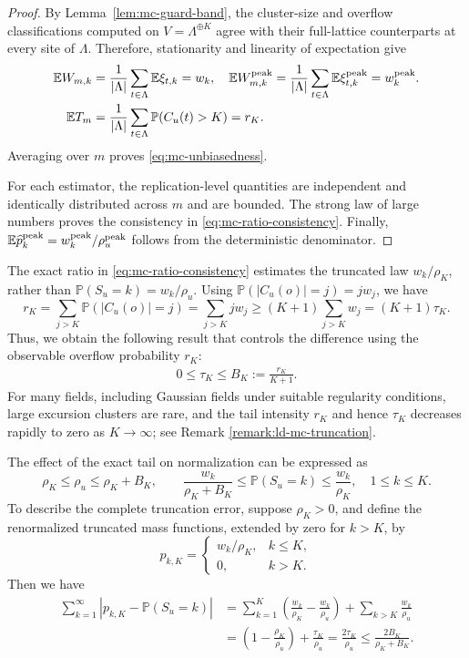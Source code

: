 \documentclass[aap,preprint]{imsart}
\theoremstyle{plain}
\theoremstyle{definition}
\def\E{{\mathbb E}}
\def\P{{\mathbb P}}
\begin{document}
\begin{proof}
	By Lemma~\ref{lem:mc-guard-band}, the cluster-size and overflow
	classifications computed on $V=\Lambda^{\oplus K}$ agree with their
	full-lattice counterparts at every site of $\Lambda$.  Therefore,
	stationarity and linearity of expectation give
	\begin{align*}
		\E W_{m,k}
		&=\frac1{|\Lambda|}\sum_{t\in\Lambda}\E\xi_{t,k}
		=w_k, \quad \E W_{m,k}^{\rm peak}
		=\frac1{|\Lambda|}\sum_{t\in\Lambda}
		\E\xi_{t,k}^{\rm peak}
		=w_k^{\rm peak}.\\
		\E T_m
		&=\frac1{|\Lambda|}\sum_{t\in\Lambda}
		\P(C_u(t)>K) = 
		r_K.
	\end{align*}
	Averaging over $m$ proves \eqref{eq:mc-unbiasedness}.  
	
	For each estimator, the replication-level quantities are independent and
	identically distributed across $m$ and are bounded.  The strong law of
	large numbers proves the consistency in \eqref{eq:mc-ratio-consistency}. Finally, $\E\widehat p_k^{\rm peak}=w_k^{\rm peak}/\rho_u^{\rm peak}$ follows
	from the deterministic denominator.
\end{proof}

The exact ratio in \eqref{eq:mc-ratio-consistency} estimates the truncated
law $w_k/\rho_K$, rather than $\P(S_u=k)=w_k/\rho_u$. 	Using $\P(|C_u(o)|=j)=j w_j$, we have
\[
r_K
=\sum_{j>K}\P(|C_u(o)|=j)
=\sum_{j>K}j w_j
\geq(K+1)\sum_{j>K}w_j=(K+1)\tau_K.
\]
Thus, we obtain the following result that
controls the difference using the observable overflow probability $r_K$:
	\begin{align}\label{eq:tau-B}
		0\leq\tau_K
		\leq B_K:=\frac{r_K}{K+1}.
	\end{align}
For many fields, including Gaussian fields under suitable regularity conditions, large excursion clusters are rare, and the tail intensity $r_K$ and hence $\tau_K$ decreases rapidly to zero as $K\to\infty$; see Remark \ref{remark:ld-mc-truncation}.

The effect of the exact tail on normalization can be expressed as
\begin{equation*}
	\rho_K\leq\rho_u\leq\rho_K+B_K,
	\qquad
	\frac{w_k}{\rho_K+B_K}
	\leq\P(S_u=k)
	\leq\frac{w_k}{\rho_K},
	\quad 1\leq k\leq K.
\end{equation*}
To describe the complete truncation error, suppose $\rho_K>0$, and define the renormalized truncated mass functions,
extended by zero for $k>K$, by
\[
p_{k,K}=
\begin{cases}
	w_k/\rho_K,&k\leq K,\\
	0,&k>K.
\end{cases}
\]
Then we have
\begin{equation}\label{eq:mc-exact-TV-truncation}
	\begin{split}
	\sum_{k=1}^{\infty} \left|
	p_{k,K}
	-\P(S_u=k)
	\right| &= \sum_{k=1}^K \left(\frac{w_k}{\rho_K} - \frac{w_k}{\rho_u}\right)+ \sum_{k>K} \frac{w_k}{\rho_u}\\
	&= \left(1-\frac{\rho_K}{\rho_u}\right) + \frac{\tau_K}{\rho_u} =\frac{2\tau_K}{\rho_u}
	\leq\frac{2B_K}{\rho_K+B_K}.
	\end{split}
\end{equation}
\end{document}
